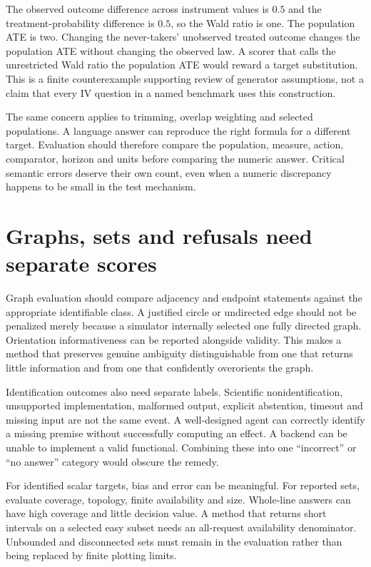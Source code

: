 The observed outcome difference across instrument values is \(0.5\) and
the treatment-probability difference is \(0.5\), so the Wald ratio is one.
The population ATE is two. Changing the never-takers' unobserved treated
outcome changes the population ATE without changing the observed law. A
scorer that calls the unrestricted Wald ratio the population ATE would
reward a target substitution. This is a finite counterexample supporting
review of generator assumptions, not a claim that every IV question in a
named benchmark uses this construction.

The same concern applies to trimming, overlap weighting and selected
populations. A language answer can reproduce the right formula for a
different target. Evaluation should therefore compare the population,
measure, action, comparator, horizon and units before comparing the numeric
answer. Critical semantic errors deserve their own count, even when a
numeric discrepancy happens to be small in the test mechanism.

\section{Graphs, sets and refusals need separate scores}

Graph evaluation should compare adjacency and endpoint statements against
the appropriate identifiable class. A justified circle or undirected edge
should not be penalized merely because a simulator internally selected one
fully directed graph. Orientation informativeness can be reported alongside
validity. This makes a method that preserves genuine ambiguity distinguishable
from one that returns little information and from one that confidently
overorients the graph.

Identification outcomes also need separate labels. Scientific
nonidentification, unsupported implementation, malformed output, explicit
abstention, timeout and missing input are not the same event. A well-designed
agent can correctly identify a missing premise without successfully computing
an effect. A backend can be unable to implement a valid functional. Combining
these into one ``incorrect'' or ``no answer'' category would obscure the
remedy.

For identified scalar targets, bias and error can be meaningful. For reported
sets, evaluate coverage, topology, finite availability and size. Whole-line
answers can have high coverage and little decision value. A method that
returns short intervals on a selected easy subset needs an all-request
availability denominator. Unbounded and disconnected sets must remain in the
evaluation rather than being replaced by finite plotting limits.

